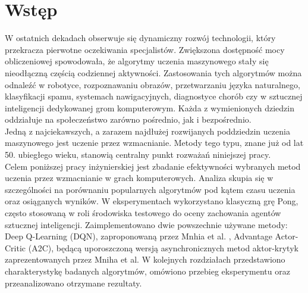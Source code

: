 \documentclass[a4paper, 12pt]{article}
\begin{document}
    \section{Wstęp}
    W ostatnich dekadach obserwuje się dynamiczny rozwój technologii, który przekracza pierwotne oczekiwania specjalistów.
    Zwiększona dostępność mocy obliczeniowej spowodowała, że algorytmy uczenia maszynowego stały się nieodłączną częścią codziennej aktywności.
    Zastosowania tych algorytmów można odnaleźć w robotyce, rozpoznawaniu obrazów, przetwarzaniu języka naturalnego, klasyfikacji spamu, systemach nawigacyjnych, diagnostyce chorób czy w sztucznej inteligencji dedykowanej grom komputerowym. 
    Każda z wymienionych dziedzin oddziałuje na społeczeństwo zarówno pośrednio, jak i bezpośrednio.
    \\
    \indent Jedną z najciekawszych, a zarazem najdłużej rozwijanych poddziedzin uczenia maszynowego jest uczenie przez wzmacnianie. 
    Metody tego typu, znane już od lat 50. ubiegłego wieku, stanowią centralny punkt rozważań niniejszej pracy.
    \\
    \indent Celem poniższej pracy inżynierskiej jest zbadanie efektywności wybranych metod uczenia przez wzmacnianie w grach komputerowych. 
    Analiza skupia się w szczególności na porównaniu popularnych algorytmów pod kątem czasu uczenia oraz osiąganych wyników.
    W eksperymentach wykorzystano klasyczną grę Pong, często stosowaną w roli środowiska testowego do oceny zachowania agentów sztucznej inteligencji. 
    Zaimplementowano dwie powszechnie używane metody: Deep Q-Learning (DQN), zaproponowaną przez Mnhia et al. \cite{mnih2015dqn}, Advantage Actor-Critic (A2C),
    będącą uporoszczoną wersją asynchronicznych metod aktor-krytyk zaprezentowanych przez Mniha et al. \cite{mnih2016a3c} 
    W kolejnych rozdziałach przedstawiono charakterystykę badanych algorytmów, omówiono przebieg eksperymentu oraz przeanalizowano otrzymane rezultaty.
\end{document}
